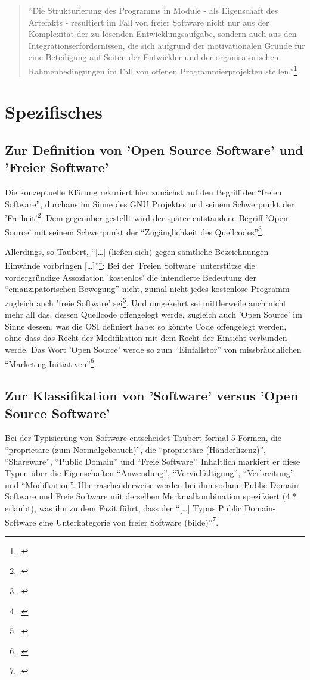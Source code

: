 \documentclass[DIV=calc,BCOR=5mm,11pt,headings=small,oneside,abstract=true, toc=bib]{scrartcl}
\begin{document}
\begin{quote}
\enquote{Die Strukturierung des Programms in Module - als Eigenschaft des
Artefakts - resultiert im Fall von freier Software nicht nur aus der Komplexität
der zu lösenden Entwicklungsaufgabe, sondern auch aus den
Integrationserfordernissen, die sich aufgrund der motivationalen Gründe für eine
Beteiligung auf Seiten der Entwickler und der organisatorischen
Rahmenbedingungen im Fall von offenen Programmierprojekten
stellen.}\footcite[][206]{Taubert2006a}
\end{quote}

\section{Spezifisches}
\subsection{Zur Definition von 'Open Source Software' und 'Freier Software'}
Die konzeptuelle Klärung rekuriert hier zunächst auf den Begriff der
\enquote{freien Software}, durchaus im Sinne des GNU Projektes und seinem
Schwerpunkt der 'Freiheit'\footcite[cf.][17]{Taubert2006a}.  Dem gegenüber
gestellt wird der später entstandene Begriff 'Open Source' mit seinem
Schwerpunkt der \enquote{Zugänglichkeit des
Quellcodes}\footcite[cf.][18]{Taubert2006a}.

Allerdings, so Taubert, \enquote{[\ldots] (ließen sich) gegen sämtliche
Bezeichnungen Ein\-wände vorbringen
[\ldots]}\footcite[cf.][19]{Taubert2006a}: Bei der 'Freien Software'
unterstütze die vordergründige Assoziation 'kostenlos' die intendierte Bedeutung
der \enquote{emanzipatorischen Bewegung} nicht, zumal nicht jedes kostenlose
Programm zugleich auch 'freie Software' sei\footcite[cf.][19]{Taubert2006a}.
Und umgekehrt sei mittlerweile auch nicht mehr all das, dessen Quellcode
offengelegt werde, zugleich auch 'Open Source' im Sinne dessen, was die OSI
definiert habe: so könnte Code offengelegt werden, ohne dass das Recht der
Modifikation mit dem Recht der Einsicht verbunden werde. Das Wort 'Open Source'
werde so zum \enquote{Einfallstor} von missbräuchlichen
\enquote{Marketing-Initiativen}\footcite[cf.][19f]{Taubert2006a}.

\subsection{Zur Klassifikation von 'Software' versus 'Open Source Software'}

Bei der Typisierung von Software entscheidet Taubert formal 5 Formen, die
\enquote{proprietäre (zum Normalgebrauch)}, die
\enquote{proprietäre (Händerlizenz)}, \enquote{Shareware}, \enquote{Public
Domain} und \enquote{Freie Software}. Inhaltlich markiert er diese
Typen über die Eigenschaften \enquote{Anwendung},
\enquote{Vervielfältigung}, \enquote{Verbreitung} und
\enquote{Modifkation}. Überraschenderweise werden bei ihm sodann Public
Domain Software und Freie Software mit derselben Merkmalkombination spezifziert
(4 * erlaubt), was ihn zu dem Fazit führt, dass der \enquote{[\ldots] Typus Public
Domain-Software eine Unterkategorie von freier Software
(bilde)}\footcite[cf.][25]{Taubert2006a}.
\end{document}
